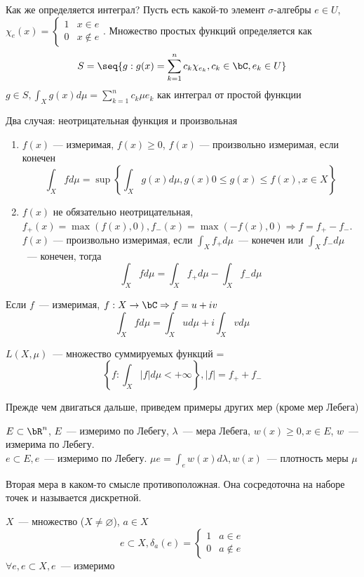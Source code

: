 \documentclass[document]{subfiles}
\begin{document}
Как же определяется интеграл?
Пусть есть какой-то элемент $\sigma$-алгебры $e \in U$, $\chi_e(x) = \begin{cases} 
    1 & x \in e \\
    0 & x \notin e
\end{cases}.$
Множество простых функций определяется как
\[S =  \seq{g : g(x) = \sum^n_{k=1} c_k \chi_{e_k}, c_k \in \bC, e_k \in U} \]
$g \in S, \int_X g(x) d\mu = \sum^n_{k=1} c_k \mu e_k$ как интеграл от простой функции


\begin{definition}
    Два случая: неотрицательная функция и произвольная
    \begin{enumerate}
        \item $f(x)$ --- измеримая, $f(x) \geq 0$, $f(x)$ --- произвольно измеримая, если конечен
            \[ \int_X f d\mu = \sup \left\{ \int_X g(x) d\mu, g(x) 0 \leq g(x) \leq f(x), x \in X \right\} \]
        \item $f(x)$ не обязательно неотрицательная, $f_+(x) = \max (f(x), 0), f_-(x) = \max(-f(x), 0) \Rightarrow f = f_+ - f_-$. $f(x)$ --- произвольно измеримая, 
        если $\int_X f_+ d\mu$~--- конечен или $\int_X f_- d\mu$~--- конечен, тогда 
        \[\int_X f d\mu = \int_X f_+ d\mu - \int_X f_- d\mu \]
    \end{enumerate}
\end{definition}


Если $f$~--- измеримая, $f: X \rightarrow \bC \Rightarrow f = u + iv$
\[ \int_X f d\mu = \int_X u d\mu + i \int_X v d\mu \]
\begin{definition}
    $L(X, \mu)$~--- множество суммируемых функций =
    \[ \left\{ f : \int_X |f| d\mu < + \infty \right\}, |f| = f_+ + f_- \]
\end{definition}

Прежде чем двигаться дальше, приведем примеры других мер (кроме мер Лебега)
\begin{example}
    $E \subset \bR^n$, $E$~--- измеримо по Лебегу, $\lambda$~--- мера Лебега, $w(x) \geq 0, x \in E$, $w$~--- измерима по Лебегу. \\
    
    $e \subset E, e$~--- измеримо по Лебегу.
    $ \mu e = \int_e w(x) d \lambda, w(x)$~--- плотность меры $\mu$
\end{example}
Вторая мера в каком-то смысле противоположная. Она сосредоточна на наборе точек и называется дискретной.
\begin{example}
    $X$~--- множество ($X \ne \varnothing$), $a \in X$
    \[  e \subset X, \delta_a(e) = \begin{cases}
        1 & a \in e \\
        0 & a \notin e 
    \end{cases} \] 
    $\forall e, e \subset  X, e$~--- измеримо
\end{example}
\end{document}
